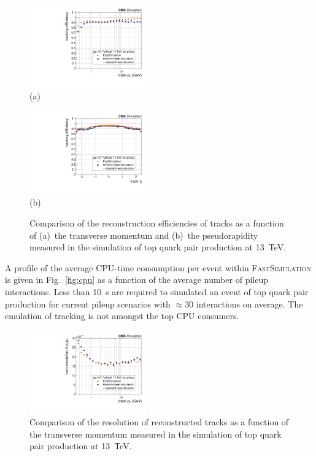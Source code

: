 \documentclass[a4paper]{jpconf}
\begin{document}
\begin{figure}[htbp]
\begin{center}
\parbox{0.46\textwidth}{\centering\includegraphics[width=0.45\textwidth]{figures/eff_pt.pdf}\\(a)}
\hspace{0.05\textwidth}
\parbox{0.46\textwidth}{\centering\includegraphics[width=0.45\textwidth]{figures/eff_eta.pdf}\\(b)}
\caption{\label{fig:eff-tracks}Comparison of the reconstruction efficiencies of tracks as a function of (a)~the transverse momentum and (b)~the pseudorapidity measured in the simulation of top quark pair production at 13~TeV.}
\end{center}
\end{figure}



A profile of the average CPU-time consumption per event within \textsc{FastSimulation} is given in Fig.~\ref{fig:cpu} as a function of the average number of pileup interactions. Less than 10~s are required to simulated an event of top quark pair production for current pileup scenarios with $\approx30$ interactions on average. The emulation of tracking is not amongst the top CPU consumers.


\begin{figure}[htbp]
\begin{center}
\includegraphics[width=0.45\textwidth]{figures/res_pt.pdf}
\caption{\label{fig:res-track}Comparison of the resolution of reconstructed tracks as a function of the transverse momentum measured in the simulation of top quark pair production at 13~TeV.}
\end{center}
\end{figure}
\end{document}
